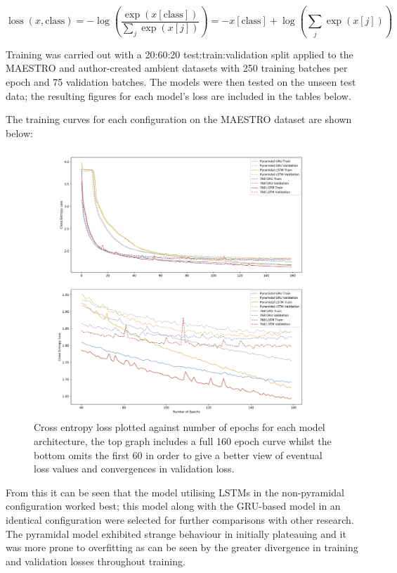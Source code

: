 \documentclass[12pt,]{article}
\begin{document}
\[
\operatorname{loss}(x, \text {class})=-\log \left(\frac{\exp (x[\text{class}])}{\sum_{j} \exp (x[j])}\right)=-x[\text {class}]+\log \left(\sum_{j} \exp (x[j])\right)
\]

Training was carried out with a 20:60:20 test:train:validation split
applied to the MAESTRO and author-created ambient datasets with 250
training batches per epoch and 75 validation batches. The models were
then tested on the unseen test data; the resulting figures for each
model's loss are included in the tables below.

The training curves for each configuration on the MAESTRO dataset are
shown below:

\begin{figure}
\centering
\includegraphics{Images/loss.png}
\caption{Cross entropy loss plotted against number of epochs for each
model architecture, the top graph includes a full 160 epoch curve whilst
the bottom omits the first 60 in order to give a better view of eventual
loss values and convergences in validation loss.}
\end{figure}

From this it can be seen that the model utilising LSTMs in the
non-pyramidal configuration worked best; this model along with the
GRU-based model in an identical configuration were selected for further
comparisons with other research. The pyramidal model exhibited strange
behaviour in initially plateauing and it was more prone to overfitting
as can be seen by the greater divergence in training and validation
losses throughout training.
\end{document}

